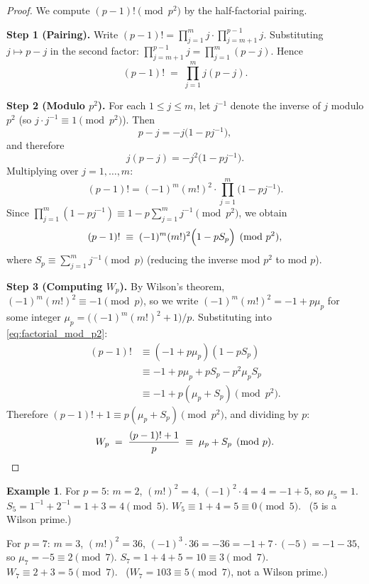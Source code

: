 \documentclass[12pt,a4paper]{amsart}
\theoremstyle{definition}
\newtheorem{example}[theorem]{Example}
\begin{document}
\begin{proof}
  We compute $(p-1)! \pmod{p^2}$ by the half-factorial pairing.

  \textbf{Step 1 (Pairing).}
  Write $(p-1)! = \prod_{j=1}^m j \cdot \prod_{j=m+1}^{p-1} j$.
  Substituting $j \mapsto p-j$ in the second factor:
  $\prod_{j=m+1}^{p-1} j = \prod_{j=1}^m (p-j).$
  Hence
  \[
    (p-1)! \;=\; \prod_{j=1}^m j(p-j).
  \]

  \textbf{Step 2 (Modulo $p^2$).}
  For each $1 \leq j \leq m$, let $j^{-1}$ denote the inverse of $j$ modulo $p^2$
  (so $j \cdot j^{-1} \equiv 1 \pmod{p^2}$).  Then
  \[
    p - j = -j\bigl(1 - p j^{-1}\bigr),
  \]
  and therefore
  \[
    j(p-j) = -j^2\bigl(1 - pj^{-1}\bigr).
  \]
  Multiplying over $j = 1, \ldots, m$:
  \[
    (p-1)! = (-1)^m (m!)^2 \cdot \prod_{j=1}^m \bigl(1 - pj^{-1}\bigr).
  \]
  Since $\prod_{j=1}^m(1 - pj^{-1}) \equiv 1 - p\sum_{j=1}^m j^{-1} \pmod{p^2}$,
  we obtain
  \begin{equation}\label{eq:factorial_mod_p2}
    (p-1)! \;\equiv\; (-1)^m(m!)^2 \Bigl(1 - pS_p\Bigr) \pmod{p^2},
  \end{equation}
  where $S_p \equiv \sum_{j=1}^m j^{-1} \pmod p$ (reducing the inverse mod $p^2$
  to mod $p$).

  \textbf{Step 3 (Computing $W_p$).}
  By Wilson's theorem, $(-1)^m(m!)^2 \equiv -1 \pmod p$, so we write
  $(-1)^m(m!)^2 = -1 + p\mu_p$ for some integer $\mu_p = \bigl((-1)^m(m!)^2+1\bigr)/p$.
  Substituting into \eqref{eq:factorial_mod_p2}:
  \begin{align*}
    (p-1)! &\equiv (-1+p\mu_p)(1-pS_p)\\
           &\equiv -1 + p\mu_p + pS_p - p^2\mu_p S_p\\
           &\equiv -1 + p(\mu_p + S_p) \pmod{p^2}.
  \end{align*}
  Therefore $(p-1)! + 1 \equiv p(\mu_p + S_p) \pmod{p^2}$, and dividing by $p$:
  \[
    W_p \;=\; \frac{(p-1)!+1}{p} \;\equiv\; \mu_p + S_p \pmod p. \qedhere
  \]
\end{proof}

\begin{example}
  For $p = 5$: $m = 2$, $(m!)^2 = 4$, $(-1)^2 \cdot 4 = 4 = -1 + 5$,
  so $\mu_5 = 1$.  $S_5 = 1^{-1} + 2^{-1} = 1 + 3 = 4 \pmod 5$.
  $W_5 \equiv 1 + 4 = 5 \equiv 0 \pmod 5$. \checkmark\ ($5$ is a Wilson prime.)

  For $p = 7$: $m = 3$, $(m!)^2 = 36$, $(-1)^3 \cdot 36 = -36 = -1 + 7 \cdot (-5) = -1 - 35$,
  so $\mu_7 = -5 \equiv 2 \pmod 7$.  $S_7 = 1+4+5 = 10 \equiv 3 \pmod 7$.
  $W_7 \equiv 2+3 = 5 \pmod 7$. \checkmark\ ($W_7 = 103 \equiv 5 \pmod 7$, not a Wilson prime.)
\end{example}
\end{document}
